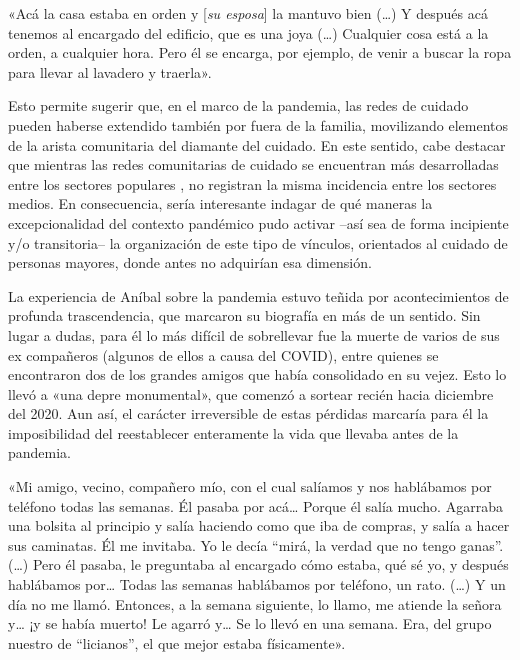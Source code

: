 \begin{refsection}
\begin{gbcita}
«Acá la casa estaba en orden y [\emph{su esposa}] la mantuvo bien (…) Y después acá tenemos al encargado del edificio, que es una joya (…) Cualquier cosa está a la orden, a cualquier hora. Pero él se encarga, por ejemplo, de venir a buscar la ropa para llevar al lavadero y traerla».

\end{gbcita}

Esto permite sugerir que, en el marco de la pandemia, las redes de cuidado pueden haberse extendido también por fuera de la familia, movilizando elementos de la arista comunitaria del diamante del cuidado. En este sentido, cabe destacar que mientras las redes comunitarias de cuidado se encuentran más desarrolladas entre los sectores populares \protect\parencite{4214-GONZALVEZTORRALBO2021}, no registran la misma incidencia entre los sectores medios. En consecuencia, sería interesante indagar de qué maneras la excepcionalidad del contexto pandémico pudo activar –así sea de forma incipiente y/o transitoria– la organización de este tipo de vínculos, orientados al cuidado de personas mayores, donde antes no adquirían esa dimensión.

La experiencia de Aníbal sobre la pandemia estuvo teñida por acontecimientos de profunda trascendencia, que marcaron su biografía en más de un sentido. Sin lugar a dudas, para él lo más difícil de sobrellevar fue la muerte de varios de sus ex compañeros (algunos de ellos a causa del COVID), entre quienes se encontraron dos de los grandes amigos que había consolidado en su vejez. Esto lo llevó a «una depre monumental», que comenzó a sortear recién hacia diciembre del 2020. Aun así, el carácter irreversible de estas pérdidas marcaría para él la imposibilidad del reestablecer enteramente la vida que llevaba antes de la pandemia.


\begin{gbcita}
«Mi amigo, vecino, compañero mío, con el cual salíamos y nos hablábamos por teléfono todas las semanas. Él pasaba por acá… Porque él salía mucho. Agarraba una bolsita al principio y salía haciendo como que iba de compras, y salía a hacer sus caminatas. Él me invitaba. Yo le decía “mirá, la verdad que no tengo ganas”. (…) Pero él pasaba, le preguntaba al encargado cómo estaba, qué sé yo, y después hablábamos por… Todas las semanas hablábamos por teléfono, un rato. (…) Y un día no me llamó. Entonces, a la semana siguiente, lo llamo, me atiende la señora y… ¡y se había muerto! Le agarró y… Se lo llevó en una semana. Era, del grupo nuestro de “licianos”, el que mejor estaba físicamente».


\end{gbcita}
\end{refsection}
